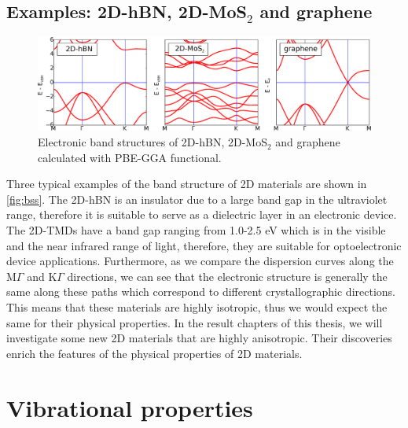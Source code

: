 \subsection{Examples: 2D-hBN, 2D-MoS$_2$ and graphene}
\begin{figure}[htbp!] 
\centering  
\includegraphics[width=\textwidth]{bss.eps}
\caption[Electronic band structures of 2D-hBN, 2D-MoS$_2$ and graphene]{ Electronic band structures of 2D-hBN, 2D-MoS$_2$ and graphene calculated with PBE-GGA functional. }  
\label{fig:bss}
\end{figure} 
Three typical examples of the band structure of 2D materials are shown in \autoref{fig:bss}. The 2D-hBN is an insulator due to a large band gap in the ultraviolet range, therefore it is suitable to serve as a dielectric layer in an electronic device. The 2D-TMDs have a band gap ranging from 1.0-2.5 eV which is in the visible and the near infrared range of light, therefore, they are suitable for optoelectronic device applications. Furthermore, as we compare the dispersion curves along the $\mathrm{M}\Gamma$ and $\mathrm{K}\Gamma$ directions, we can see that the electronic structure is generally the same along these paths which correspond to different crystallographic directions. This means that these materials are highly isotropic, thus we would expect the same for their physical properties. In the result chapters of this thesis, we will investigate some new 2D materials that are highly anisotropic. Their discoveries enrich the features of the physical properties of 2D materials.

\section{Vibrational properties}

